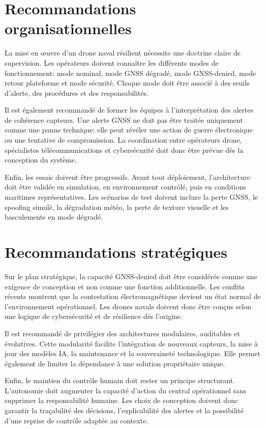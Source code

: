 \documentclass[12pt, a4paper, twoside, openright]{report}
\begin{document}
\section{Recommandations organisationnelles}
La mise en œuvre d’un drone naval résilient nécessite une doctrine claire de supervision. Les opérateurs doivent connaître les différents modes de fonctionnement: mode nominal, mode GNSS dégradé, mode GNSS-denied, mode retour plateforme et mode sécurité. Chaque mode doit être associé à des seuils d’alerte, des procédures et des responsabilités.

Il est également recommandé de former les équipes à l’interprétation des alertes de cohérence capteurs. Une alerte GNSS ne doit pas être traitée uniquement comme une panne technique: elle peut révéler une action de guerre électronique ou une tentative de compromission. La coordination entre opérateurs drone, spécialistes télécommunications et cybersécurité doit donc être prévue dès la conception du système.

Enfin, les essais doivent être progressifs. Avant tout déploiement, l’architecture doit être validée en simulation, en environnement contrôlé, puis en conditions maritimes représentatives. Les scénarios de test doivent inclure la perte GNSS, le spoofing simulé, la dégradation météo, la perte de texture visuelle et les basculements en mode dégradé.

\section{Recommandations stratégiques}
Sur le plan stratégique, la capacité GNSS-denied doit être considérée comme une exigence de conception et non comme une fonction additionnelle. Les conflits récents montrent que la contestation électromagnétique devient un état normal de l’environnement opérationnel. Les drones navals doivent donc être conçus selon une logique de cybersécurité et de résilience dès l’origine.

Il est recommandé de privilégier des architectures modulaires, auditables et évolutives. Cette modularité facilite l’intégration de nouveaux capteurs, la mise à jour des modèles IA, la maintenance et la souveraineté technologique. Elle permet également de limiter la dépendance à une solution propriétaire unique.

Enfin, le maintien du contrôle humain doit rester un principe structurant. L’autonomie doit augmenter la capacité d’action du central opérationnel sans supprimer la responsabilité humaine. Les choix de conception doivent donc garantir la traçabilité des décisions, l’explicabilité des alertes et la possibilité d’une reprise de contrôle adaptée au contexte.
\end{document}
